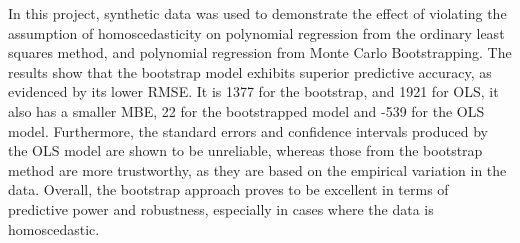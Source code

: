 In this project, synthetic data was used to demonstrate the effect of violating the assumption of homoscedasticity on polynomial regression from the ordinary least squares method, and polynomial regression from Monte Carlo Bootstrapping. The results show that the bootstrap model exhibits superior predictive accuracy, as evidenced by its lower RMSE. It is 1377 for the bootstrap, and 1921 for OLS, it also has a smaller MBE, 22 for the bootstrapped model and -539 for the OLS model. Furthermore, the standard errors and confidence intervals produced by the OLS model are shown to be unreliable, whereas those from the bootstrap method are more trustworthy, as they are based on the empirical variation in the data. Overall, the bootstrap approach proves to be excellent in terms of predictive power and robustness, especially in cases where the data is homoscedastic.